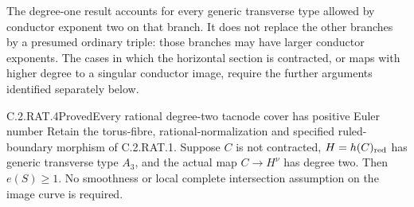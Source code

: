 The degree-one result accounts for every generic transverse
type allowed by conductor exponent two on that branch. It
does not replace the other branches by a presumed ordinary
triple: those branches may have larger conductor exponents.
The cases in which the horizontal section is contracted, or
maps with higher degree to a singular conductor image, require
the further arguments identified separately below.

\begin{statement}{C.2.RAT.4}{Proved}{Every rational degree-two tacnode cover has positive Euler number}
Retain the torus-fibre, rational-normalization and specified
ruled-boundary morphism of C.2.RAT.1. Suppose $C$ is not
contracted, $H=h(C)_{\rm red}$ has generic transverse type
$A_3$, and the actual map $C\to H^\nu$ has degree two.
Then $e(S)\ge1$. No smoothness or local complete intersection
assumption on the image curve is required.
\end{statement}
